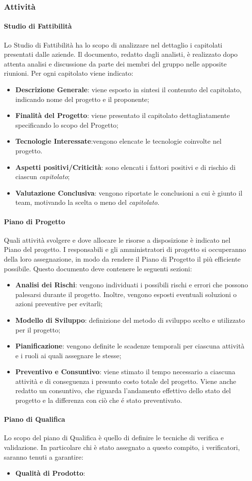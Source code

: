 \subsubsection{Attività}
\paragraph{Studio di Fattibilità}
Lo Studio di Fattibilità ha lo scopo di analizzare nel dettaglio i capitolati presentati dalle aziende. Il documento,  redatto dagli analisti, è realizzato dopo attenta analisi e discussione da parte dei membri del gruppo nelle apposite riunioni. Per ogni capitolato viene indicato:
\begin{itemize}
  \item \textbf{Descrizione Generale}: viene esposto in sintesi il contenuto del capitolato, indicando nome del progetto e il proponente;
  \item \textbf{Finalità del Progetto}: viene presentato il capitolato dettagliatamente specificando lo scopo del Progetto;
  \item \textbf{Tecnologie Interessate}:vengono elencate le tecnologie coinvolte nel progetto.
  \item \textbf{Aspetti positivi/Criticità}: sono elencati i fattori positivi e di rischio di ciascun \textit{capitolato\glos};
  \item \textbf{Valutazione Conclusiva}: vengono riportate le conclusioni a cui è giunto il team, motivando la scelta o meno del \textit{capitolato\glos}.
\end{itemize}
\paragraph{Piano di Progetto}
Quali attività svolgere e dove allocare le risorse a disposizione è indicato nel Piano del progetto. I responsabili e gli amministratori di progetto si occuperanno della loro assegnazione, in modo da rendere il Piano di Progetto il più efficiente possibile. Questo documento deve contenere le seguenti sezioni:
\begin{itemize}
  \item \textbf{Analisi dei Rischi}: vengono individuati i possibili rischi e errori che possono palesarsi durante il progetto. Inoltre, vengono esposti eventuali soluzioni o azioni preventive per evitarli;
  \item \textbf{Modello di Sviluppo}: definizione del metodo di sviluppo scelto e utilizzato per il progetto;
  \item \textbf{Pianificazione}: vengono definite le scadenze temporali per ciascuna attività e i ruoli ai quali assegnare le stesse;
  \item \textbf{Preventivo e Consuntivo}: viene stimato il tempo necessario a ciascuna attività e di conseguenza i presunto costo totale del progetto. Viene anche redatto un consuntivo, che riguarda l'andamento effettivo dello stato del progetto e la differenza con ciò che é stato preventivato.
\end{itemize}
\paragraph{Piano di Qualifica}
Lo scopo del piano di Qualifica è quello di definire le tecniche di verifica e validazione. In particolare chi è stato assegnato a questo compito, i verificatori, saranno tenuti a garantire:
\begin{itemize}
  \item \textbf{Qualità di Prodotto}:
\end{itemize}
